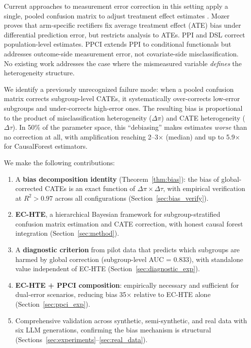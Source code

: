 \documentclass[11pt,twocolumn]{article}
\begin{document}
Current approaches to measurement error correction in this setting apply a single, pooled confusion matrix to adjust treatment effect estimates \cite{angelopoulos2023,egami2024}. Mozer \cite{mozer2026} proves that arm-specific rectifiers fix average treatment effect (ATE) bias under differential prediction error, but restricts analysis to ATEs. PPI \cite{angelopoulos2023} and DSL \cite{egami2024} correct population-level estimates. PPCI \cite{sui2026} extends PPI to conditional functionals but addresses outcome-side measurement error, not covariate-side misclassification. No existing work addresses the case where the mismeasured variable \emph{defines} the heterogeneity structure.

We identify a previously unrecognized failure mode: when a pooled confusion matrix corrects subgroup-level CATEs, it systematically over-corrects low-error subgroups and under-corrects high-error ones. The resulting bias is proportional to the product of misclassification heterogeneity ($\Delta\pi$) and CATE heterogeneity ($\Delta\tau$). In 50\% of the parameter space, this ``debiasing'' makes estimates \emph{worse} than no correction at all, with amplification reaching 2--3$\times$ (median) and up to 5.9$\times$ for CausalForest estimators.

We make the following contributions:
\begin{enumerate}[nosep,leftmargin=*]
\item A \textbf{bias decomposition identity} (Theorem~\ref{thm:bias}): the bias of global-corrected CATEs is an exact function of $\Delta\pi \times \Delta\tau$, with empirical verification at $R^2 > 0.97$ across all configurations (Section~\ref{sec:bias_verify}).
\item \textbf{EC-HTE}, a hierarchical Bayesian framework for subgroup-stratified confusion matrix estimation and CATE correction, with honest causal forest integration (Section~\ref{sec:method}).
\item A \textbf{diagnostic criterion} from pilot data that predicts which subgroups are harmed by global correction (subgroup-level AUC = 0.833), with standalone value independent of EC-HTE (Section~\ref{sec:diagnostic_exp}).
\item \textbf{EC-HTE + PPCI composition}: empirically necessary and sufficient for dual-error scenarios, reducing bias 35$\times$ relative to EC-HTE alone (Section~\ref{sec:ppci_exp}).
\item Comprehensive validation across synthetic, semi-synthetic, and real data with six LLM generations, confirming the bias mechanism is structural (Sections~\ref{sec:experiments}--\ref{sec:real_data}).
\end{enumerate}
\end{document}
